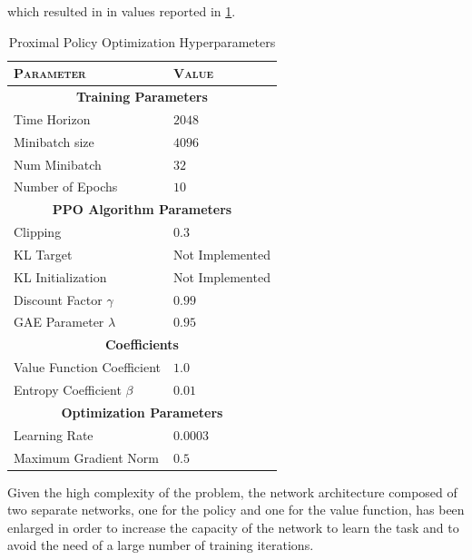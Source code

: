 which resulted in in values reported in \cref{tab:ppohyperparameters}.


\begin{table}[h]
    \centering
    \label{tab:ppohyperparameters}
    \begin{tabular}{ll}
        \toprule
        \textsc{Parameter}          & \textsc{Value}          \\
        \midrule
        \multicolumn{2}{c}{\textbf{Training Parameters}}      \\
        Time Horizon                & $2048$                  \\
        Minibatch size              & $4096$                  \\
        Num Minibatch               & $32$                    \\
        Number of Epochs            & $10$                    \\
        \midrule
        \multicolumn{2}{c}{\textbf{PPO Algorithm Parameters}} \\
        Clipping                    & $0.3$                   \\
        KL Target                   & Not Implemented         \\
        KL Initialization           & Not Implemented         \\
        Discount Factor $\gamma$    & $0.99$                  \\
        GAE Parameter $\lambda$     & $0.95$                  \\
        \midrule
        \multicolumn{2}{c}{\textbf{Coefficients}}             \\
        Value Function Coefficient  & $1.0$                   \\
        Entropy Coefficient $\beta$ & $0.01$                  \\
        \midrule
        \multicolumn{2}{c}{\textbf{Optimization Parameters}}  \\
        Learning Rate               & $0.0003$                \\
        Maximum Gradient Norm       & $0.5$                   \\
        \bottomrule
    \end{tabular}
    \caption{Proximal Policy Optimization Hyperparameters}
\end{table}

Given the high complexity of the problem, the network architecture composed of two separate networks, one for the policy and one for the value function, has been enlarged in order to increase the capacity of the network to learn the task and to avoid the need of a large number of training iterations.

